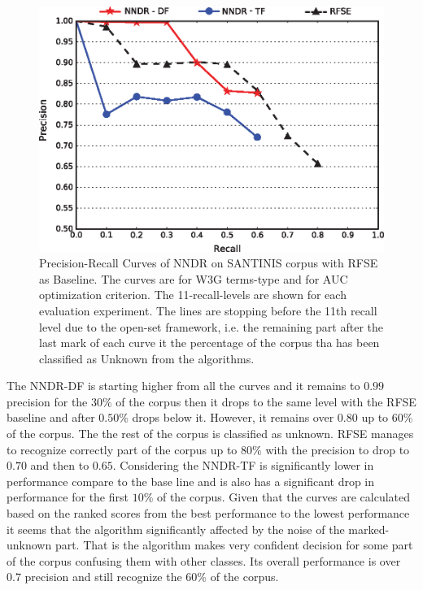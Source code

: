 \documentclass[runningheads]{llncs}
\begin{document}
\begin{figure}[H]
\begin{center}
    \includegraphics[scale=0.99]{NNDR_W3G_Best_RFSE-Baseline_2.eps}
	\caption{Precision-Recall Curves of NNDR on SANTINIS corpus with RFSE as Baseline. The curves are for W3G terms-type and for AUC optimization criterion. The 11-recall-levels are shown for each evaluation experiment. The lines are stopping before the 11th recall level due to the open-set framework, i.e. the remaining part after the last mark of each curve it the percentage of the corpus tha has been classified as Unknown from the algorithms.}
	\label{fig:NNDR_W3G_Best_RFSE_Baseline}
	\end{center}
\end{figure}

The NNDR-DF is starting higher from all the curves and it remains to $0.99$ precision for the $30\%$ of the corpus then it drops to the same level with the RFSE baseline and after $0.50\%$ drops below it. However, it remains over $0.80$ up to $60\%$ of the corpus. The the rest of the corpus is classified as unknown. RFSE manages to recognize correctly part of the corpus up to $80\%$ with the precision to drop to $0.70$ and then to $0.65$. Considering the NNDR-TF is significantly lower in performance compare to the base line and is also has a significant drop in performance for the first $10\%$ of the corpus. Given that the curves are calculated based on the ranked scores from the best performance to the lowest performance it seems that the algorithm significantly affected by the noise of the marked-unknown part. That is the algorithm makes very confident decision for some part of the corpus confusing them with other classes. Its overall performance is over $0.7$ precision and still recognize the $60\%$ of the corpus.
\end{document}
